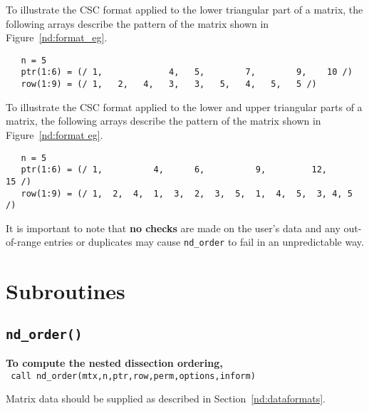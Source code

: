 To illustrate the CSC format applied to the lower triangular part of a matrix, 
the following arrays describe the pattern of the matrix shown in
Figure~\ref{nd:format_eg}.
\begin{verbatim}
   n = 5
   ptr(1:6) = (/ 1,             4,   5,        7,        9,    10 /)
   row(1:9) = (/ 1,   2,   4,   3,   3,   5,   4,   5,   5 /)
\end{verbatim}

To illustrate the CSC format applied to the lower and upper triangular parts of 
a matrix, the following arrays describe the pattern of the matrix shown in
Figure~\ref{nd:format eg}.
\begin{verbatim}
   n = 5
   ptr(1:6) = (/ 1,          4,      6,          9,         12,       15 /)
   row(1:9) = (/ 1,  2,  4,  1,  3,  2,  3,  5,  1,  4,  5,  3, 4, 5 /)
\end{verbatim}


It is important to note
that {\bf no checks} are made on the user's data and any out-of-range entries 
or duplicates may cause {\tt nd\_order} to fail in an unpredictable way. 



\section{Subroutines}


\subsection{{\tt nd\_order()}}

{\bf To compute the nested dissection ordering,}
   \vspace*{0.3cm} \\
\texttt{\hspace*{0.2cm} call nd\_order(mtx,n,ptr,row,perm,options,inform)}
\vspace{0.3em}

\noindent
Matrix data should be supplied as described in Section~\ref{nd:dataformats}. 

